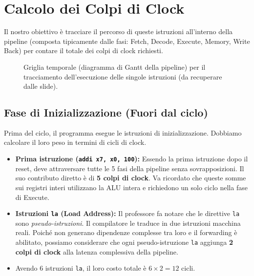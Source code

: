 \section{Calcolo dei Colpi di Clock}

Il nostro obiettivo è tracciare il percorso di queste istruzioni all'interno della pipeline (composta tipicamente dalle fasi: Fetch, Decode, Execute, Memory, Write Back) per contare il totale dei colpi di clock richiesti.


\begin{figure}[H]
    \centering
    \vspace{4cm} %
    \caption{Griglia temporale (diagramma di Gantt della pipeline) per il tracciamento dell'esecuzione delle singole istruzioni (da recuperare dalle slide).}
    \label{fig:griglia-pipeline}
\end{figure}

\subsection{Fase di Inizializzazione (Fuori dal ciclo)}
Prima del ciclo, il programma esegue le istruzioni di inizializzazione. Dobbiamo calcolare il loro peso in termini di cicli di clock.

\begin{itemize}
    \item \textbf{Prima istruzione (\texttt{addi x7, x0, 100}):} Essendo la prima istruzione dopo il reset, deve attraversare tutte le 5 fasi della pipeline senza sovrapposizioni. Il suo contributo diretto è di \textbf{5 colpi di clock}. Va ricordato che queste somme sui registri interi utilizzano la ALU intera e richiedono un solo ciclo nella fase di Execute.
    \item \textbf{Istruzioni \texttt{la} (Load Address):} Il professore fa notare che le direttive \texttt{la} sono \textit{pseudo-istruzioni}. Il compilatore le traduce in due istruzioni macchina reali. Poiché non generano dipendenze complesse tra loro e il forwarding è abilitato, possiamo considerare che ogni pseudo-istruzione \texttt{la} aggiunga \textbf{2 colpi di clock} alla latenza complessiva della pipeline.
    \item Avendo 6 istruzioni \texttt{la}, il loro costo totale è $6 \times 2 = 12$ cicli.
\end{itemize}

